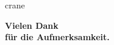 \section*{}

\begin{frame}[plain]
  \begin{center}

    \begin{minipage}{0.75\textwidth}
      \begin{beamercolorbox}{crane}
        \begin{center}
          \vspace{1em}
          \textbf{\huge Vielen Dank}
          \\
          \textbf{\small für die Aufmerksamkeit.}
          \\
          \vspace{1em}
        \end{center}
      \end{beamercolorbox}
    \end{minipage}


\end{center}
\end{frame}
